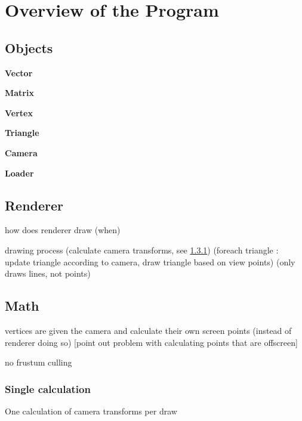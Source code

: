 \section{Overview of the Program}
\subsection{Objects}
\textbf{Vector}

\textbf{Matrix}

\textbf{Vertex}

\textbf{Triangle}

\textbf{Camera}

\textbf{Loader}

\subsection{Renderer}

how does renderer draw (when)

drawing process
	(calculate camera transforms, see \ref{Overview_Math_Single})
	(foreach triangle : update triangle according to camera, draw triangle based on view points)
	(only draws lines, not points)

\subsection{Math}

vertices are given the camera and calculate their own screen points (instead of renderer doing so) [point out problem with calculating points that are offscreen]

no frustum culling

\subsubsection{Single calculation}
\label{Overview_Math_Single}
One calculation of camera transforms per draw
